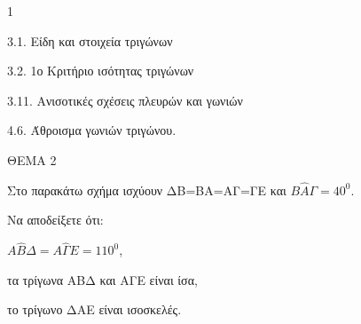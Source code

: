 \begin{ylh}{1}
    \item 3.1. Είδη και στοιχεία τριγώνων
    \item 3.2. 1ο Κριτήριο ισότητας τριγώνων
    \item 3.11. Ανισοτικές σχέσεις πλευρών και γωνιών
    \item 4.6. Άθροισμα γωνιών τριγώνου.
\end{ylh}

ΘΕΜΑ 2

Στο παρακάτω σχήμα ισχύουν ΔΒ=ΒΑ=ΑΓ=ΓΕ και $Β\widehat{Α}\Gamma = 40^{0}$.

Να αποδείξετε ότι:

\begin{alist}
\item $Α\widehat{Β}\Delta = Α\widehat{\Gamma}Ε = 110^{0}$, 

\item τα τρίγωνα ΑΒΔ και ΑΓΕ είναι ίσα, 

\item το τρίγωνο ΔΑΕ είναι ισοσκελές. 


\begin{center}
\end{center}
\end{alist}
